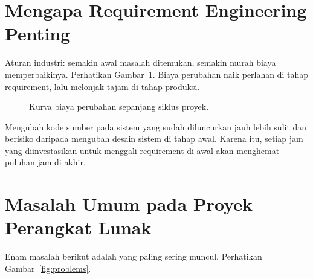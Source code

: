 \documentclass[11pt,a4paper]{article}
\begin{document}
\section{Mengapa Requirement Engineering Penting}

Aturan industri: semakin awal masalah ditemukan, semakin murah biaya memperbaikinya. Perhatikan Gambar~\ref{fig:cost-curve}. Biaya perubahan naik perlahan di tahap requirement, lalu melonjak tajam di tahap produksi.

\begin{figure}[H]
	\centering
	\caption{Kurva biaya perubahan sepanjang siklus proyek.}
	\label{fig:cost-curve}
\end{figure}

Mengubah kode sumber pada sistem yang sudah diluncurkan jauh lebih sulit dan berisiko daripada mengubah desain sistem di tahap awal. Karena itu, setiap jam yang diinvestasikan untuk menggali requirement di awal akan menghemat puluhan jam di akhir.

\section{Masalah Umum pada Proyek Perangkat Lunak}

Enam masalah berikut adalah yang paling sering muncul. Perhatikan Gambar~\ref{fig:problems}.
\end{document}
